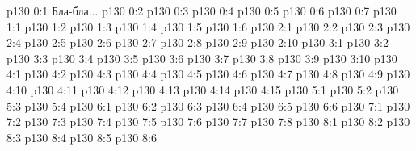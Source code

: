 \author{Промежуточные создания}
\vs p130 0:1  Бла-бла...
\vs p130 0:2 \pc 
\vs p130 0:3 
\vs p130 0:4 \pc 
\vs p130 0:5 \pc 
\vs p130 0:6 
\vs p130 0:7 
\vs p130 1:1 
\vs p130 1:2 
\vs p130 1:3 
\vs p130 1:4 \pc 
\vs p130 1:5 \pc 
\vs p130 1:6 
\vs p130 2:1 
\vs p130 2:2 \pc 
\vs p130 2:3 
\vs p130 2:4 \pc 
\vs p130 2:5 
\vs p130 2:6 \pc 
\vs p130 2:7 
\vs p130 2:8 
\vs p130 2:9 \pc 
\vs p130 2:10 \pc 
{}
\vs p130 3:1 
\vs p130 3:2 
\vs p130 3:3 \pc 
\vs p130 3:4 \pc 
\vs p130 3:5 \pc 
\vs p130 3:6 
\vs p130 3:7 \pc 
\vs p130 3:8 
\vs p130 3:9 
\vs p130 3:10 
\vs p130 4:1 
\vs p130 4:2 \pc 
\vs p130 4:3 
\vs p130 4:4 
\vs p130 4:5 
\vs p130 4:6 
\vs p130 4:7 
\vs p130 4:8 
\vs p130 4:9 
\vs p130 4:10 
\vs p130 4:11 
\vs p130 4:12 \pc 
\vs p130 4:13 \pc 
\vs p130 4:14 
\vs p130 4:15 
\vs p130 5:1 
\vs p130 5:2 
\vs p130 5:3 
\vs p130 5:4 
\vs p130 6:1 
\vs p130 6:2 
\vs p130 6:3 
\vs p130 6:4 
\vs p130 6:5 
\vs p130 6:6 \pc 
{}
\vs p130 7:1 
\vs p130 7:2 
\vs p130 7:3 
\vs p130 7:4 \pc 
\vs p130 7:5 
\vs p130 7:6 
\vs p130 7:7 
\vs p130 7:8 \pc 
{}
\vs p130 8:1 
\vs p130 8:2 \pc 
\vs p130 8:3 \pc 
\vs p130 8:4 \pc 
\vs p130 8:5 
\vs p130 8:6 
\quizlink
